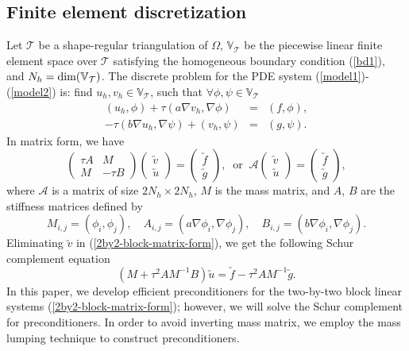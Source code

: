 \documentclass[smallcondensed]{svjour3}
\numberwithin{equation}{section} \numberwithin{table}{section}
\numberwithin{figure}{section}
\numberwithin{algorithm}{section}
\begin{document}
\subsection{Finite element discretization}
Let $\mathcal{T}$ be a shape-regular triangulation of $\Omega$, $\mathbb{V}_{\mathcal{T}}$ be the piecewise linear finite element space over $\mathcal{T}$ satisfying the homogeneous boundary condition (\ref{bd1}), and $N_h = {\rm dim(\mathbb{V}_\mathcal{T})}$. The discrete problem for the PDE system (\ref{model1})-(\ref{model2}) is: find $u_h, v_h\in\mathbb{V}_{\mathcal{T}}$, such that $\forall \phi, \psi\in\mathbb{V}_{\mathcal{T}}$
$$
\begin{array}{ccc}
(u_h,\phi)+\tau(a\nabla v_h, \nabla \phi) & = &(f,\phi),\\
-\tau(b\nabla u_h, \nabla\psi) + (v_h,\psi) & = & (g,\psi).
\end{array}
$$
In matrix form, we have
\begin{equation}
\left(
\begin{array}{rc}
\tau A & M\\
M & -\tau B
\end{array}
\right)\left(
\begin{array}{c}
\utilde{v}\\
\utilde{u}
\end{array}
\right) = 
\left(
\begin{array}{r}
\utilde{f}\\
\utilde{g}
\end{array}
\right),\;\;\text{or}\;\;\mathcal{A}
\left(
\begin{array}{c}
\utilde{v}\\
\utilde{u}
\end{array}
\right) = 
\left(
\begin{array}{r}
\utilde{f}\\
\utilde{g}
\end{array}
\right),
\label{2by2-block-matrix-form}
\end{equation}
where $\mathcal{A}$ is a matrix of size $2N_h\times 2N_h$, $M$ is the mass matrix, and $A$, $B$ are the stiffness matrices defined by
$$
M_{i,j}=(\phi_i,\phi_j),\quad A_{i,j}=(a\nabla\phi_i, \nabla\phi_j), \quad B_{i,j}=(b\nabla\phi_i,\nabla\phi_j).
$$
 Eliminating $\utilde{v}$ in (\ref{2by2-block-matrix-form}), we get the following Schur complement equation
\begin{equation}
(M+\tau^2AM^{-1}B)\utilde{u}=\utilde{f}-\tau^2AM^{-1}\utilde{g}.
\label{schur-complement-form}
\end{equation}
In this paper, we develop efficient preconditioners for the two-by-two block linear systems (\ref{2by2-block-matrix-form}); however, we will solve the Schur complement for preconditioners. In order to avoid inverting mass matrix, we employ the mass lumping technique to construct preconditioners.
\end{document}
